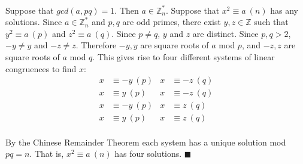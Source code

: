 \documentclass[letterpaper,12pt,oneside,onecolumn]{report}
\begin{document}
\paragraph{}
Suppose that $gcd(a,pq) = 1$. Then $a \in \mathbb{Z}^*_n$. Suppose that $x^2 \equiv a\ (n)$ has any solutions. Since $a \in \mathbb{Z}^*_n$ and $p,q$ are odd primes, there exist $y, z \in \mathbb{Z}$ such that $y^2 \equiv a\ (p)$ and $z^2 \equiv a\ (q)$. Since $p \neq q$, $y$ and $z$ are distinct. Since $p,q > 2$, $-y \neq y$ and $-z \neq z$. Therefore $-y,y$ are square roots of $a$ mod $p$, and $-z, z$ are square roots of $a$ mod $q$. This gives rise to four different systems of linear congruences to find $x$:
\begin{align}
x &\equiv -y\ (p) &x &\equiv -z\ (q)\\
x &\equiv y\ (p) &x &\equiv -z\ (q)\\
x &\equiv -y\ (p) &x &\equiv z\ (q)\\
x &\equiv y\ (p) &x &\equiv z\ (q)
\end{align}
\paragraph{}
By the Chinese Remainder Theorem each system has a unique solution mod $pq = n$. That is, $x^2 \equiv a\ (n)$ has four solutions. $\blacksquare$
\end{document}
